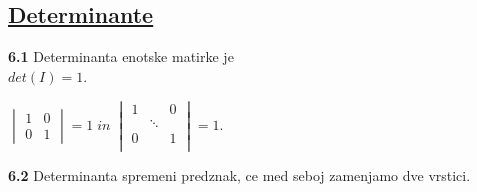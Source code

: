 \documentclass{article}
\begin{document}
\begin{multicols}{4}
\section{\underline{Determinante}}

\textbf{6.1} Determinanta enotske matirke je\\ $det(I) = 1$.
\begin{center}
    \begin{math}
        \begin{vmatrix}
            1 & 0\\
            0 & 1
        \end{vmatrix}
        = 1\; in\;
        \begin{vmatrix}
            1 & & 0\\
            & \ddots &\\
            0 & & 1\\
        \end{vmatrix}
        = 1.
    \end{math}
\end{center}

\textbf{6.2} Determinanta spremeni predznak, ce med seboj zamenjamo dve vrstici.


\end{multicols}
\end{document}
